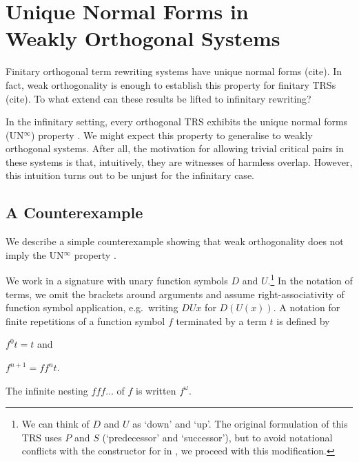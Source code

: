 \chapter[\texorpdfstring{UN$^\infty$ in Weakly Orthogonal Systems}{UN
  in Weakly Orthogonal Systems}]{\texorpdfstring{Unique Normal Forms
    in\\Weakly Orthogonal Systems}{Unique Normal Forms in Weakly
    Orthogonal Systems}}\label{chap:unwo}

Finitary orthogonal term rewriting systems have unique normal forms
(cite). In fact, weak orthogonality is enough to establish this
property for finitary TRSs (cite). To what extend can these results be
lifted to infinitary rewriting?

In the infinitary setting, every orthogonal TRS exhibits the unique
normal forms (UN$^\infty$) property
\citep{kennaway-95,klop-de-vrijer-05}. We might expect this property
to generalise to weakly orthogonal systems. After all, the motivation
for allowing trivial critical pairs in these systems is that,
intuitively, they are witnesses of harmless overlap. However, this
intuition turns out to be unjust for the infinitary case.


\section{A Counterexample}\label{sec:counterexample}

We describe a simple counterexample showing that weak orthogonality
does not imply the UN$^\infty$ property \citep{endrullis-10}.

We work in a signature with unary function symbols $D$ and
$U$.\footnote{We can think of $D$ and $U$ as `down' and `up'. The
  original formulation of this TRS uses $P$ and $S$ (`predecessor' and
  `successor'), but to avoid notational conflicts with the
  constructor for
  in \Coq, we proceed with this modification.}
In the notation of terms, we omit the brackets around arguments and
assume right-associativity of function symbol application,
e.g.\ writing $DUx$ for $D(U(x))$. A notation for finite repetitions
of a function symbol $f$ terminated by a term $t$ is defined by
\begin{inparaenum}[(i)]
\item $f^0 t = t$ and
\item $f^{n+1} = ff^nt$.
\end{inparaenum}
The infinite nesting $fff \ldots$ of $f$ is written $f^\omega$.

